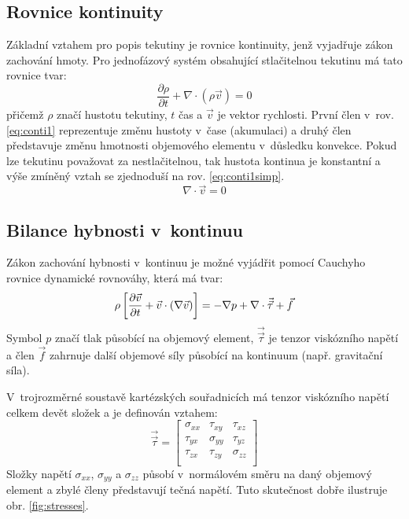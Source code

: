 \subsection{Rovnice kontinuity}

Základní vztahem pro popis tekutiny je rovnice kontinuity, jenž vyjadřuje zákon zachování hmoty. Pro jednofázový systém obsahující stlačitelnou tekutinu má tato rovnice tvar:
\begin{equation}
	\frac{\partial \rho}{\partial t} + \nabla \cdot (\rho\vec{v}) = 0
	\label{eq:conti1}
\end{equation}
přičemž $\rho$ značí hustotu tekutiny, $t$ čas a $\vec{v}$ je vektor rychlosti. První člen v~rov. \ref{eq:conti1} reprezentuje změnu hustoty v~čase (akumulaci) a druhý člen představuje změnu hmotnosti objemového elementu v~důsledku konvekce. Pokud lze tekutinu považovat za nestlačitelnou, tak hustota kontinua je konstantní a výše zmíněný vztah se zjednoduší na rov. \ref{eq:conti1simp}.
\begin{equation}
	\nabla \cdot \vec{v} = 0
	\label{eq:conti1simp}
\end{equation}  

\subsection{Bilance hybnosti v~kontinuu}
Zákon zachování hybnosti v~kontinuu je možné vyjádřit pomocí Cauchyho rovnice dynamické rovnováhy, která má tvar:
\begin{equation}
    \rho \left[ \frac{\partial \vec{v}}{\partial t} + \vec{v} \cdot \left( \nabla \vec{v} \right) \right] = -\nabla p +  \nabla \cdot \vec{\vec{\tau}} + \vec{f}
  	\label{eq:cauchy}
\end{equation} 
Symbol $p$ značí tlak působící na objemový element, $\vec{\vec{\tau}}$ je tenzor viskózního napětí a člen $\vec{f}$ zahrnuje další objemové síly působící na kontinuum (např. gravitační síla).

V~trojrozměrné soustavě kartézských souřadnicích má tenzor viskózního napětí celkem devět složek a je definován vztahem:
\begin{equation}
    \vec{\vec{\tau}} = 
    \begin{bmatrix}
      \sigma_{xx} & \tau_{xy} & \tau_{xz}\\ 
      \tau_{yx} & \sigma_{yy} & \tau_{yz}\\ 
      \tau_{zx} & \tau_{zy} & \sigma_{zz}\\ 
    \end{bmatrix}
  	\label{eq:tenstress}
\end{equation} 
Složky napětí $\sigma_{xx}$, $\sigma_{yy}$ a $\sigma_{zz}$ působí v~normálovém směru na daný objemový element a zbylé členy představují tečná napětí. Tuto skutečnost dobře ilustruje obr. \ref{fig:stresses}. 

